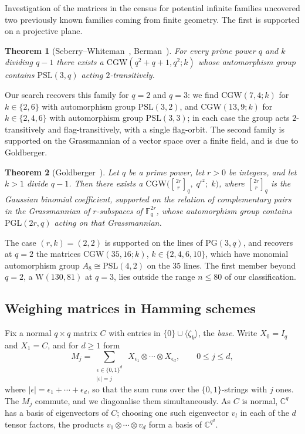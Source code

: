\documentclass{article}
\newtheorem{theorem}{Theorem}[section]
\theoremstyle{definition}
\theoremstyle{remark}
\newcommand{\F}{\mathbb{F}}
\newcommand{\C}{\mathbb{C}}
\newcommand{\CGW}{\mathrm{CGW}}
\newcommand{\We}{\mathrm{W}}
\begin{document}
Investigation of the matrices in the census for potential infinite families uncovered two previously known families coming from finite geometry. The first is supported on a projective plane.

\begin{theorem}[Seberry--Whiteman~\cite{SeberryWhiteman1975}, Berman~\cite{Berman1978}]\label{thm:seberrywhiteman}
For every prime power $q$ and $k$ dividing $q-1$ there exists a $\CGW(q^2+q+1, q^2; k)$
whose automorphism group contains $\mathrm{PSL}(3,q)$ acting $2$-transitively.
\end{theorem}

Our search recovers this family for $q = 2$ and $q = 3$: we find
$\CGW(7,4;k)$ for $k \in \{2,6\}$ with automorphism group
$\mathrm{PSL}(3,2)$, and $\CGW(13,9;k)$ for $k \in \{2,4,6\}$ with
automorphism group $\mathrm{PSL}(3,3)$; in each case the group acts
$2$-transitively and flag-transitively, with a single flag-orbit.
The second family is supported on the Grassmannian of a vector space over
a finite field, and is due to Goldberger.

\begin{theorem}[Goldberger~{\cite[Theorem~6.9]{Goldberger2024}}]\label{thm:goldberger}
Let $q$ be a prime power, let $r > 0$ be integers, and let $k > 1$
divide $q-1$.  Then there exists a
$\CGW\bigl(\genfrac{[}{]}{0pt}{}{2r}{r}_q,\; q^{r^2};\; k\bigr)$,
where $\genfrac{[}{]}{0pt}{}{2r}{r}_q$ is the Gaussian binomial coefficient,
supported on the relation of complementary pairs in the Grassmannian of
$r$-subspaces of $\F_q^{2r}$, whose automorphism group contains
$\mathrm{PGL}(2r,q)$ acting on that Grassmannian.
\end{theorem}

The case $(r,k) = (2,2)$ is supported on the lines of
$\mathrm{PG}(3,q)$, and recovers at $q = 2$ the matrices
$\CGW(35,16;k)$, $k \in \{2,4,6,10\}$, which have monomial automorphism group
$A_8 \cong \mathrm{PSL}(4,2)$ on the $35$ lines.  The
first member beyond $q = 2$, a $\We(130,81)$ at $q = 3$, lies outside the
range $n \le 80$ of our classification.


\subsection{Weighing matrices in Hamming schemes}\label{sec:hamming}

Fix a normal $q\times q$ matrix $C$ with entries in $\{0\}\cup\langle\zeta_k\rangle$,
the \emph{base}.  Write $X_0=I_q$ and $X_1=C$, and for $d\geq1$ form
\[
  M_j=\sum_{\substack{\epsilon\in\{0,1\}^d\\|\epsilon|=j}}\ X_{\epsilon_1}\otimes\cdots\otimes X_{\epsilon_d},
  \qquad 0\leq j\leq d,
\]
where $|\epsilon|=\epsilon_1+\cdots+\epsilon_d$, so that the sum runs over the
$\{0,1\}$-strings with $j$ ones.  The $M_j$ commute, and we diagonalise them
simultaneously.  As $C$ is normal, $\C^q$ has a basis of eigenvectors of $C$;
choosing one such eigenvector $v_l$ in each of the $d$ tensor factors, the
products $v_1\otimes\cdots\otimes v_d$ form a basis of $\C^{q^d}$.
\end{document}
